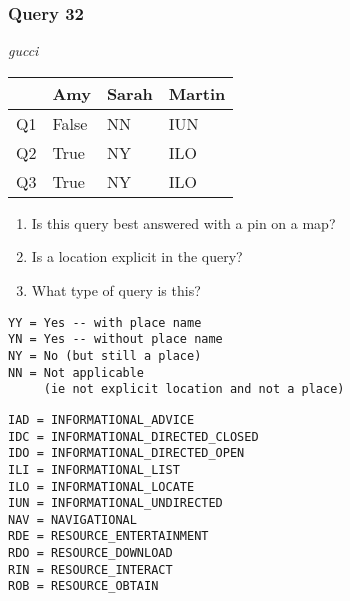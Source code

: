 \begin{frame}[fragile]
\frametitle{Query 32}
\vspace{1em}

\emph{gucci}

\vfill

\begin{table}
  \centering
  \begin{tabular}{ l l l l }
    & \textbf{Amy} & \textbf{Sarah} & \textbf{Martin}\\
    \toprule
    Q1 & False & NN & IUN\\
Q2 & True & NY & ILO\\
Q3 & True & NY & ILO\\
    \bottomrule
  \end{tabular}
\end{table}

\vfill

\tiny{

\begin{enumerate}
\item Is this query best answered with a pin on a map?
\item Is a location explicit in the query?
\item What type of query is this?
\end{enumerate}

\vfill

\begin{multicols}{2}
\begin{verbatim}
YY = Yes -- with place name
YN = Yes -- without place name
NY = No (but still a place)
NN = Not applicable 
     (ie not explicit location and not a place)
\end{verbatim}

\columnbreak
\begin{verbatim}
IAD = INFORMATIONAL_ADVICE
IDC = INFORMATIONAL_DIRECTED_CLOSED
IDO = INFORMATIONAL_DIRECTED_OPEN
ILI = INFORMATIONAL_LIST
ILO = INFORMATIONAL_LOCATE
IUN = INFORMATIONAL_UNDIRECTED
NAV = NAVIGATIONAL
RDE = RESOURCE_ENTERTAINMENT
RDO = RESOURCE_DOWNLOAD
RIN = RESOURCE_INTERACT
ROB = RESOURCE_OBTAIN
\end{verbatim}
\end{multicols}
}

\end{frame}


